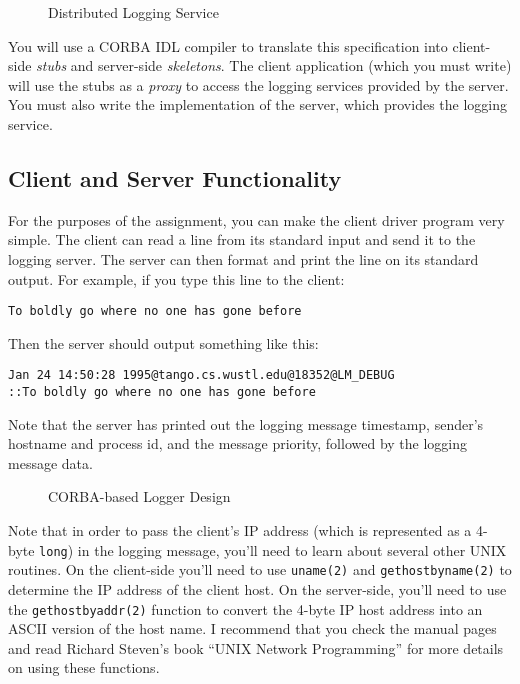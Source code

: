 \begin{figure}
\vspace{-0.12in}
\caption{Distributed Logging Service}
\label{logenv}
\end{figure}

You will use a CORBA IDL compiler to translate this specification into
client-side {\em stubs} and server-side {\em skeletons}.  The client
application (which you must write) will use the stubs as a {\em proxy}
to access the logging services provided by the server.  You must also
write the implementation of the server, which provides the logging
service.

\subsection{Client and Server Functionality}
For the purposes of the assignment, you can make the client driver
program very simple.  The client can read a line from its standard
input and send it to the logging server.  The server can then format
and print the line on its standard output.  For example, if you type
this line to the client:

\begin{verbatim}
To boldly go where no one has gone before
\end{verbatim}

\noindent Then the server should output something like this:

\begin{verbatim}
Jan 24 14:50:28 1995@tango.cs.wustl.edu@18352@LM_DEBUG
::To boldly go where no one has gone before
\end{verbatim}

\noindent Note that the server has printed out the logging message
timestamp, sender's hostname and process id, and the message priority,
followed by the logging message data.

\begin{figure}
\vspace{-0.12in}
\caption{CORBA-based Logger Design}
\label{simplog}
\end{figure}

Note that in order to pass the client's IP address (which is
represented as a 4-byte {\tt long}) in the logging message, you'll
need to learn about several other UNIX routines.  On the client-side
you'll need to use {\tt uname(2)} and {\tt gethostbyname(2)} to
determine the IP address of the client host.  On the server-side,
you'll need to use the {\tt gethostbyaddr(2)} function to convert the
4-byte IP host address into an ASCII version of the host name.  I
recommend that you check the manual pages and read Richard Steven's
book ``UNIX Network Programming'' for more details on using these
functions.

